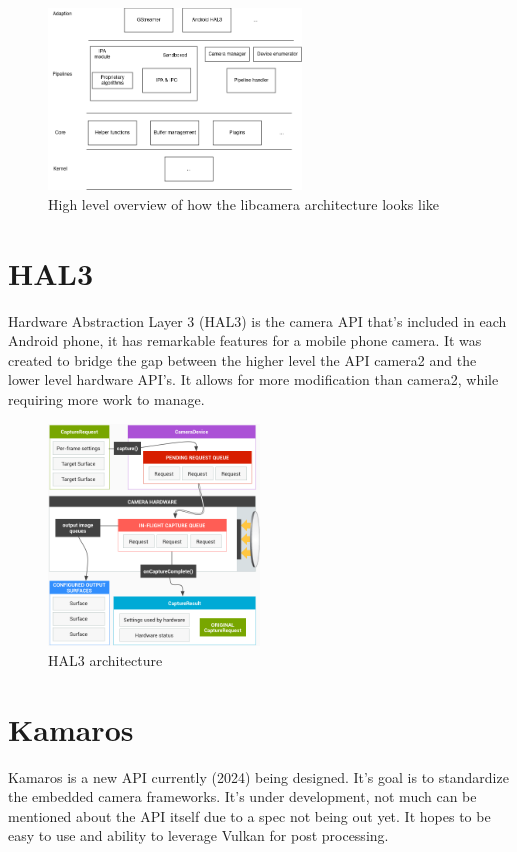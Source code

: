 \begin{figure}
    \begin{center}
        \includegraphics[width=0.60\textwidth]{figures/libcameraarch.png}
    \end{center}
    \caption{High level overview of how the libcamera architecture looks like}
    \label{fig:libcameraarch}
\end{figure}


\section{HAL3}
Hardware Abstraction Layer 3 (HAL3) is the camera API that's included in each
Android phone, it has remarkable features for a mobile phone camera. It was
created to bridge the gap between the higher level the API camera2 and the
lower level hardware API's. It allows for more modification than camera2, while
requiring more work to manage.


\begin{figure}
    \begin{center}
        \includegraphics[width=0.5\textwidth]{figures/hal3arch}
    \end{center}
    \caption{HAL3 architecture \cite{hal3arch}}\label{fig:hal3arch}
\end{figure}

\section{Kamaros}
Kamaros is a new API currently (2024) being designed. It's goal is to
standardize the embedded camera frameworks. It's under development, not much can
be mentioned about the API itself due to a spec not being out yet. It hopes to
be easy to use and ability to leverage Vulkan for post processing.

